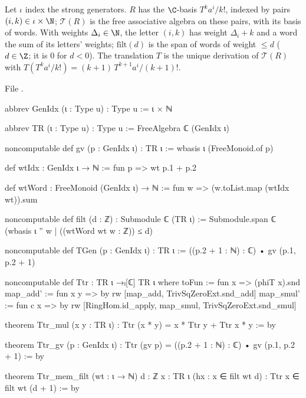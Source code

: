 \begin{definition}\label{l11:def:TR}
Let $\iota$ index the strong generators. $R$ has the $\C$-basis $T^ka^i/k!$, indexed by pairs $(i,k)\in\iota\times\N$;
$\mathcal T(R)$ is the free associative algebra on these pairs, with its basis of words. With weights $\Delta_i\in\N$,
the letter $(i,k)$ has weight $\Delta_i+k$ and a word the sum of its letters' weights; $\mathrm{filt}(d)$ is the span of words
of weight $\le d$ ($d\in\Z$; it is $0$ for $d<0$). The translation $T$ is the unique derivation of $\mathcal T(R)$ with
$T(T^ka^i/k!) = (k+1)\,T^{k+1}a^i/(k+1)!$.
\end{definition}
\noindent File .
\begin{leancode}
abbrev GenIdx (ι : Type u) : Type u := ι × ℕ

abbrev TR (ι : Type u) : Type u := FreeAlgebra ℂ (GenIdx ι)

noncomputable def gv (p : GenIdx ι) : TR ι := wbasis ι (FreeMonoid.of p)

def wtIdx : GenIdx ι → ℕ := fun p => wt p.1 + p.2

def wtWord : FreeMonoid (GenIdx ι) → ℕ := fun w => (w.toList.map (wtIdx wt)).sum

noncomputable def filt (d : ℤ) : Submodule ℂ (TR ι) :=
  Submodule.span ℂ (wbasis ι '' {w | ((wtWord wt w : ℤ)) ≤ d})

noncomputable def TGen (p : GenIdx ι) : TR ι := ((p.2 + 1 : ℕ) : ℂ) • gv (p.1, p.2 + 1)

noncomputable def Ttr : TR ι →ₗ[ℂ] TR ι where
  toFun := fun x => (phiT x).snd
  map_add' := fun x y => by rw [map_add, TrivSqZeroExt.snd_add]
  map_smul' := fun c x => by rw [RingHom.id_apply, map_smul, TrivSqZeroExt.snd_smul]

theorem Ttr_mul (x y : TR ι) : Ttr (x * y) = x * Ttr y + Ttr x * y := by

theorem Ttr_gv (p : GenIdx ι) : Ttr (gv p) = ((p.2 + 1 : ℕ) : ℂ) • gv (p.1, p.2 + 1) := by

theorem Ttr_mem_filt (wt : ι → ℕ) {d : ℤ} {x : TR ι} (hx : x ∈ filt wt d) :
    Ttr x ∈ filt wt (d + 1) := by
\end{leancode}

